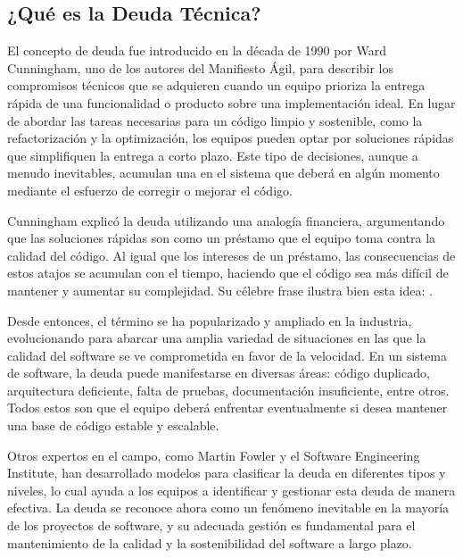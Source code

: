 \subsection{¿Qué es la Deuda Técnica?}
El concepto de \gls{deuda} fue introducido en la década de 1990 por Ward Cunningham, uno de los autores del Manifiesto Ágil, para describir los compromisos técnicos que se adquieren cuando un equipo prioriza la entrega rápida de una funcionalidad o producto sobre una implementación ideal. En lugar de abordar las tareas necesarias para un código limpio y sostenible, como la refactorización y la optimización, los equipos pueden optar por soluciones rápidas que simplifiquen la entrega a corto plazo. Este tipo de decisiones, aunque a menudo inevitables, acumulan una  en el sistema que deberá  en algún momento mediante el esfuerzo de corregir o mejorar el código.

Cunningham explicó la \gls{deuda} utilizando una analogía financiera, argumentando que las soluciones rápidas son como un préstamo que el equipo toma contra la calidad del código. Al igual que los intereses de un préstamo, las consecuencias de estos atajos se acumulan con el tiempo, haciendo que el código sea más difícil de mantener y aumentar su complejidad. Su célebre frase ilustra bien esta idea: \cite{introtodebt}.

Desde entonces, el término se ha popularizado y ampliado en la industria, evolucionando para abarcar una amplia variedad de situaciones en las que la calidad del software se ve comprometida en favor de la velocidad. En un sistema de software, la \gls{deuda} puede manifestarse en diversas áreas: código duplicado, arquitectura deficiente, falta de pruebas, documentación insuficiente, entre otros. Todos estos son  que el equipo deberá enfrentar eventualmente si desea mantener una base de código estable y escalable.

Otros expertos en el campo, como Martin Fowler y el Software Engineering Institute, han desarrollado modelos para clasificar la \gls{deuda} en diferentes tipos y niveles, lo cual ayuda a los equipos a identificar y gestionar esta deuda de manera efectiva. La \gls{deuda} se reconoce ahora como un fenómeno inevitable en la mayoría de los proyectos de software, y su adecuada gestión es fundamental para el mantenimiento de la calidad y la sostenibilidad del software a largo plazo.

